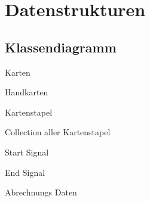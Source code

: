 \section{Datenstrukturen} 

\subsection{Klassendiagramm}

Karten

Handkarten

Kartenstapel

Collection aller Kartenstapel

Start Signal

End Signal

Abrechnungs Daten